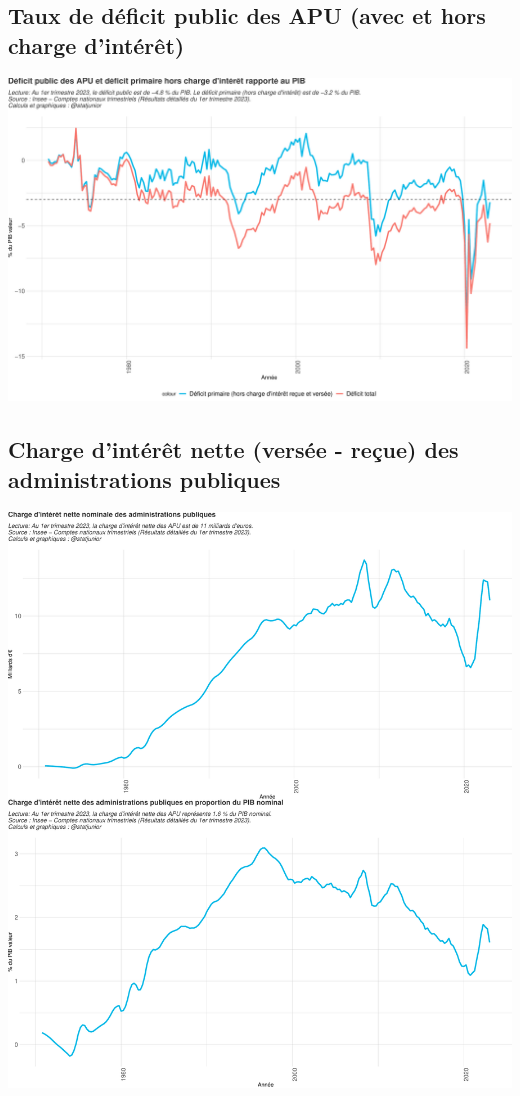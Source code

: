 \documentclass[
  paper=a4,
  ,captions=tableheading
]{scrartcl}
\begin{document}
\hypertarget{taux-de-duxe9ficit-public-des-apu-avec-et-hors-charge-dintuxe9ruxeat}{%
\subsection{Taux de déficit public des APU (avec et hors charge
d'intérêt)}\label{taux-de-duxe9ficit-public-des-apu-avec-et-hors-charge-dintuxe9ruxeat}}

\includegraphics{rapport_pdf_csi_files/figure-latex/unnamed-chunk-16-1.pdf}

\hypertarget{charge-dintuxe9ruxeat-nette-versuxe9e---reuxe7ue-des-administrations-publiques}{%
\subsection{Charge d'intérêt nette (versée - reçue) des administrations
publiques}\label{charge-dintuxe9ruxeat-nette-versuxe9e---reuxe7ue-des-administrations-publiques}}

\includegraphics{rapport_pdf_csi_files/figure-latex/unnamed-chunk-17-1.pdf}
\end{document}
